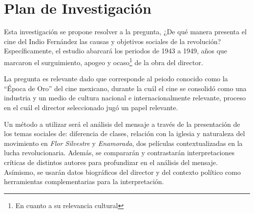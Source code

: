 \section{Plan de Investigación}
Esta investigación se propone resolver a la pregunta,
¿De qué manera presenta el cine del Indio Fernández las causas y objetivos sociales de la revolución? Específicamente, el estudio abarcará los periodos de 1943 a 1949, años que marcaron el surguimiento, apogeo y ocaso\footnote{En cuanto a su relevancia cultural} de la obra del director\autocite[133]{mora_mexican_1978-2}.

La pregunta es relevante dado que corresponde al peiodo conocido como la ``Época de Oro'' del cine mexicano, durante la cuál el cine se consolidó como una industria y un medio de cultura nacional e internacionalmente relevante, proceso en el cuál el director seleccionado jugó un papel relevante\autocite[133]{mora_mexican_1978-2}.

Un método a utilizar será el análisis del mensaje a través de la presentación de los temas sociales de: diferencia de clases, relación con la iglesia y naturaleza del movimiento en \emph{Flor Silvestre} y  \emph{Enamorada}, dos películas contextualizadas en la lucha revolucionaria. Además, se compararán y contrastarán interpretaciones críticas de distintos autores para profundizar en el análisis del mensaje.  Asímismo, se usarán datos biográficos del director y del contexto político como herramientas complementarias para la interpretación. 

\pagebreak
